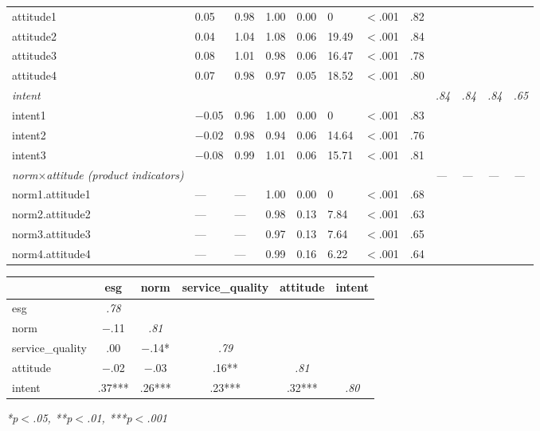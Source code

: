 \documentclass{article}
\begin{document}
\begin{tabular}{llllllllllll}
\quad attitude1 & 0.05 & 0.98 & 1.00 & 0.00 & 0 & $<$.001 & .82 &  &  &  &  \\
\quad attitude2 & 0.04 & 1.04 & 1.08 & 0.06 & 19.49 & $<$.001 & .84 &  &  &  &  \\
\quad attitude3 & 0.08 & 1.01 & 0.98 & 0.06 & 16.47 & $<$.001 & .78 &  &  &  &  \\
\quad attitude4 & 0.07 & 0.98 & 0.97 & 0.05 & 18.52 & $<$.001 & .80 &  &  &  &  \\
\textit{intent} & \textit{} & \textit{} & \textit{} & \textit{} & \textit{} & \textit{} & \textit{} & \textit{.84} & \textit{.84} & \textit{.84} & \textit{.65} \\
\quad intent1 & $-$0.05 & 0.96 & 1.00 & 0.00 & 0 & $<$.001 & .83 &  &  &  &  \\
\quad intent2 & $-$0.02 & 0.98 & 0.94 & 0.06 & 14.64 & $<$.001 & .76 &  &  &  &  \\
\quad intent3 & $-$0.08 & 0.99 & 1.01 & 0.06 & 15.71 & $<$.001 & .81 &  &  &  &  \\
\textit{norm$\times$attitude (product indicators)} & \textit{} & \textit{} & \textit{} & \textit{} & \textit{} & \textit{} & \textit{} & \textit{---} & \textit{---} & \textit{---} & \textit{---} \\
\quad norm1.attitude1 & --- & --- & 1.00 & 0.00 & 0 & $<$.001 & .68 &  &  &  &  \\
\quad norm2.attitude2 & --- & --- & 0.98 & 0.13 & 7.84 & $<$.001 & .63 &  &  &  &  \\
\quad norm3.attitude3 & --- & --- & 0.97 & 0.13 & 7.64 & $<$.001 & .65 &  &  &  &  \\
\quad norm4.attitude4 & --- & --- & 0.99 & 0.16 & 6.22 & $<$.001 & .64 &  &  &  &  \\
\bottomrule
\end{tabular}

\begin{tabular}{lccccc}
\toprule
 & esg & norm & service\_quality & attitude & intent \\
\midrule
esg & \textit{.78} &  &  &  &  \\
norm & $-$.11 & \textit{.81} &  &  &  \\
service\_quality & .00 & $-$.14* & \textit{.79} &  &  \\
attitude & $-$.02 & $-$.03 & .16** & \textit{.81} &  \\
intent & .37*** & .26*** & .23*** & .32*** & \textit{.80} \\
\bottomrule
\end{tabular}
\textit{*p$<$.05, **p$<$.01, ***p$<$.001}
\end{document}
